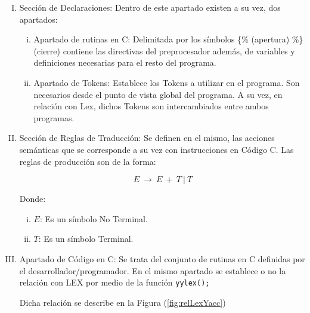 \begin{enumerate}[I.]

\item Sección de Declaraciones: Dentro de este apartado existen a su vez, dos apartados:

\begin{enumerate}[i.]

\item Apartado de rutinas en C: Delimitada por los símbolos \{\% (apertura) \%\} (cierre) contiene las directivas del preprocesador además, de variables y definiciones necesarias para el resto del programa.

\item Apartado de Tokens: Establece los Tokens a utilizar en el programa. Son necesarios desde el punto de vista global del programa. A su vez, en relación con Lex, dichos Tokens son intercambiados entre ambos programas.

\end{enumerate}

\item {Sección de Reglas de Traducción: Se definen en el mismo, las acciones semánticas que se corresponde a su vez con instrucciones en Código C. Las reglas de producción son de la forma:

\begin{equation}
E\ \longrightarrow \ E\ +\ T\ |\ T
\end{equation}

Donde:

\begin{enumerate}[i.]

\item $E$: Es un símbolo No Terminal.

\item $T$: Es un símbolo Terminal.

\end{enumerate}

}
\item Apartado de Código en C: Se trata del conjunto de rutinas en C definidas por el desarrollador/programador. En el mismo apartado se establece o no la relación con LEX por medio de la función \texttt{yylex();}


Dicha relación se describe en la Figura (\ref{fig:relLexYacc})

\end{enumerate}




